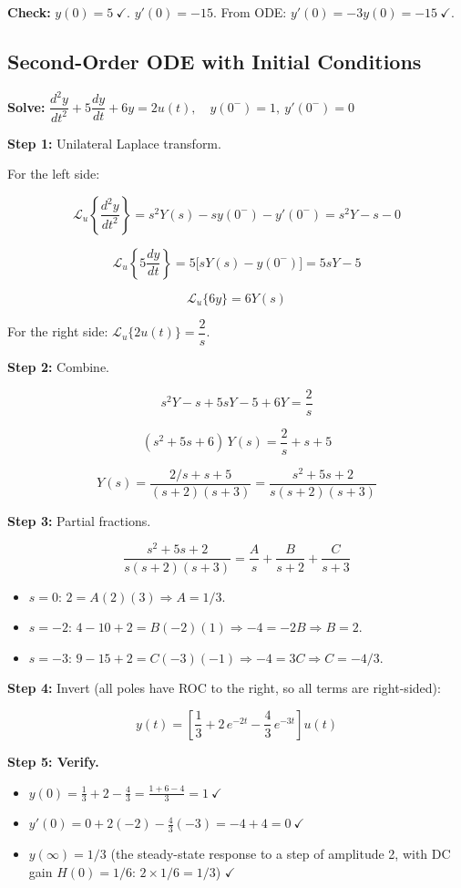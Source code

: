 \documentclass[11pt]{article}
\begin{document}
\textbf{Check:} $y(0) = 5\ \checkmark$. $y'(0) = -15$. From ODE: $y'(0) = -3 y(0) = -15\ \checkmark$.

\subsection*{Second-Order ODE with Initial Conditions}

\textbf{Solve:} $\dfrac{d^2 y}{dt^2} + 5\dfrac{dy}{dt} + 6y = 2u(t), \quad y(0^-) = 1,\ y'(0^-) = 0$

\textbf{Step 1:} Unilateral Laplace transform.

For the left side:

\[\mathcal{L}_u\!\left\{\frac{d^2 y}{dt^2}\right\} = s^2 Y(s) - s y(0^-) - y'(0^-) = s^2 Y - s - 0\]

\[\mathcal{L}_u\!\left\{5 \frac{dy}{dt}\right\} = 5\bigl[sY(s) - y(0^-)\bigr] = 5sY - 5\]

\[\mathcal{L}_u\{6y\} = 6 Y(s)\]

For the right side: $\mathcal{L}_u\{2 u(t)\} = \dfrac{2}{s}$.

\textbf{Step 2:} Combine.

\[s^2 Y - s + 5sY - 5 + 6Y = \frac{2}{s}\]

\[(s^2 + 5s + 6)\, Y(s) = \frac{2}{s} + s + 5\]

\[Y(s) = \frac{2/s + s + 5}{(s+2)(s+3)} = \frac{s^2 + 5s + 2}{s(s+2)(s+3)}\]

\textbf{Step 3:} Partial fractions.

\[\frac{s^2 + 5s + 2}{s(s+2)(s+3)} = \frac{A}{s} + \frac{B}{s+2} + \frac{C}{s+3}\]

\begin{itemize}
  \item $s = 0$: $2 = A(2)(3) \Rightarrow A = 1/3$.
  \item $s = -2$: $4 - 10 + 2 = B(-2)(1) \Rightarrow -4 = -2B \Rightarrow B = 2$.
  \item $s = -3$: $9 - 15 + 2 = C(-3)(-1) \Rightarrow -4 = 3C \Rightarrow C = -4/3$.
\end{itemize}

\textbf{Step 4:} Invert (all poles have ROC to the right, so all terms are right-sided):

\[y(t) = \left[\frac{1}{3} + 2\, e^{-2t} - \frac{4}{3}\, e^{-3t}\right] u(t)\]

\textbf{Step 5: Verify.}

\begin{itemize}
  \item $y(0) = \tfrac{1}{3} + 2 - \tfrac{4}{3} = \tfrac{1+6-4}{3} = 1\ \checkmark$
  \item $y'(0) = 0 + 2(-2) - \tfrac{4}{3}(-3) = -4 + 4 = 0\ \checkmark$
  \item $y(\infty) = 1/3$ (the steady-state response to a step of amplitude 2, with DC gain $H(0) = 1/6$: $2 \times 1/6 = 1/3$) $\checkmark$
\end{itemize}
\end{document}
